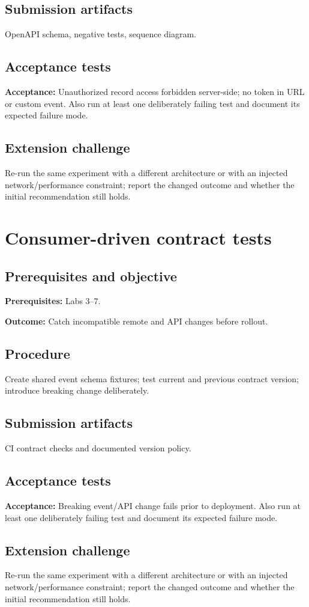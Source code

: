 \documentclass[11pt,letterpaper,oneside]{report}
\newcommand{\criterion}[1]{\textbf{Acceptance:} #1}
\begin{document}
\section{Submission artifacts}
OpenAPI schema, negative tests, sequence diagram.
\section{Acceptance tests}
\criterion{Unauthorized record access forbidden server-side; no token in URL or custom event.} Also run at least one deliberately failing test and document its expected failure mode.
\section{Extension challenge}
Re-run the same experiment with a different architecture or with an injected network/performance constraint; report the changed outcome and whether the initial recommendation still holds.

\chapter{Consumer-driven contract tests}
\section{Prerequisites and objective}
\textbf{Prerequisites:} Labs 3--7.\par
\textbf{Outcome:} Catch incompatible remote and API changes before rollout.
\section{Procedure}
Create shared event schema fixtures; test current and previous contract version; introduce breaking change deliberately.
\section{Submission artifacts}
CI contract checks and documented version policy.
\section{Acceptance tests}
\criterion{Breaking event/API change fails prior to deployment.} Also run at least one deliberately failing test and document its expected failure mode.
\section{Extension challenge}
Re-run the same experiment with a different architecture or with an injected network/performance constraint; report the changed outcome and whether the initial recommendation still holds.
\end{document}
